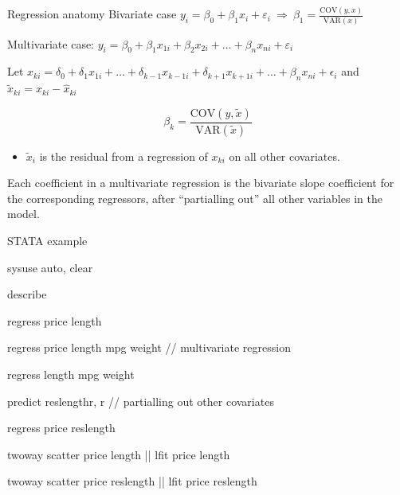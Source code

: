 \documentclass{beamer}
\begin{document}
\begin{frame}{Regression anatomy}
Bivariate case $y_i=\beta_0+\beta_1x_i+\varepsilon_i \ \Rightarrow \ \beta_1=\frac{\text{COV}(y,x)}{\text{VAR}(x)}$\bigskip\pause

Multivariate case: $y_i=\beta_0+\beta_1 x_{1i}+\beta_2 x_{2i}+\dots+\beta_n x_{ni}+\varepsilon_i$\medskip\pause

Let $x_{ki}=\delta_0+\delta_1 x_{1i}+\dots+\delta_{k-1}x_{k-1 i}+\delta_{k+1}x_{k+1i}+\dots+\beta_nx_{ni}+\epsilon_i$ and $\tilde{x}_{ki}=x_{ki}-\hat{x}_{ki}$\pause

\[ \beta_k=\frac{\text{COV}(y,\tilde{x})}{\text{VAR}(\tilde{x})} \]

\begin{itemize}
\item $\tilde{x}_i$ is the residual from a regression of $x_{ki}$ on all other covariates.
\end{itemize}
Each coefficient in a multivariate regression is the bivariate slope coefficient for the corresponding regressors, after ``partialling out'' all other variables in the model.

\end{frame}



\begin{frame}{STATA example}

\begin{tt}
sysuse auto, clear
\medskip

describe\medskip

regress price length  \medskip

regress price length mpg weight  {\color{teal} // multivariate regression}\medskip

regress length mpg weight\medskip

predict reslengthr, r {\color{teal} // partialling out  other covariates}\medskip

regress price reslength\medskip

twoway scatter price length || lfit price length\medskip

twoway scatter price reslength || lfit price reslength 

\end{tt}
\end{frame}
\end{document}

